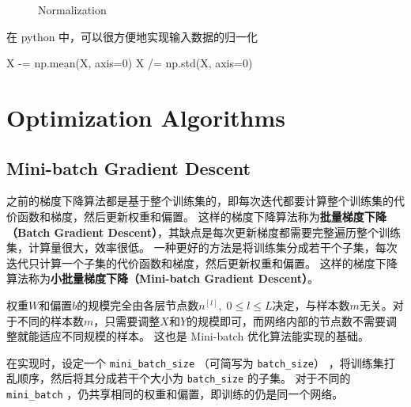 \begin{figure}[h!bt]
    \centering
    \centering
    \caption{Normalization}
    \label{fig:normalization}
\end{figure}

在 python 中，可以很方便地实现输入数据的归一化
\begin{python}
X -= np.mean(X, axis=0)
X /= np.std(X, axis=0)
\end{python}

\section{Optimization Algorithms}

\subsection{Mini-batch Gradient Descent}

之前的梯度下降算法都是基于整个训练集的，即每次迭代都要计算整个训练集的代价函数和梯度，然后更新权重和偏置。
这样的梯度下降算法称为\textbf{批量梯度下降（Batch Gradient Descent）}，其缺点是每次更新梯度都需要完整遍历整个训练集，计算量很大，效率很低。
一种更好的方法是将训练集分成若干个子集，每次迭代只计算一个子集的代价函数和梯度，然后更新权重和偏置。
这样的梯度下降算法称为\textbf{小批量梯度下降（Mini-batch Gradient Descent）}。

\begin{hint}
    权重$W$和偏置$b$的规模完全由各层节点数$n^{[l]},\; 0 \leqslant l \leqslant L$决定，与样本数$m$无关。对于不同的样本数$m$，只需要调整$X$和$Y$的规模即可，而网络内部的节点数不需要调整就能适应不同规模的样本。
    这也是 Mini-batch 优化算法能实现的基础。
\end{hint}

在实现时，设定一个 \verb|mini_batch_size| （可简写为 \verb|batch_size|） ，将训练集打乱顺序，然后将其分成若干个大小为 \verb|batch_size| 的子集。
对于不同的 \verb|mini_batch| ，仍共享相同的权重和偏置，即训练的仍是同一个网络。

